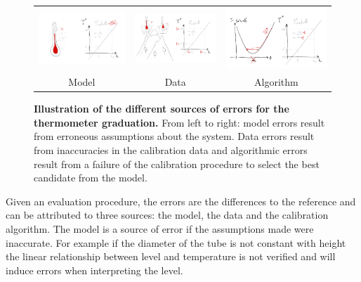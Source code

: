 \begin{bibunit}
\begin{figure}
\begin{tabular}{c|c|c}
     \hspace{-.15\linewidth}\includegraphics[width=.4\linewidth]{Introduction/pics/model_err_w_source.png}  &
     \includegraphics[width=.4\linewidth]{Introduction/pics/data_err_w_source.png} &
     \includegraphics[width=.4\linewidth]{Introduction/pics/optim_err_w_source.png} \\
     \hspace{-.15\linewidth}Model &  Data &  Algorithm \\
\end{tabular}
    \centering
    \caption{\textbf{Illustration of the different sources of errors for the thermometer graduation.} From left to right: model errors result from erroneous assumptions about the system. Data errors result from inaccuracies in the calibration data and algorithmic errors result from a failure of the calibration procedure to select the best candidate from the model.}
    \label{fig:err_sources}
\end{figure}
Given an evaluation procedure, the errors are the differences to the reference and can be attributed to three sources: the model, the data and the calibration algorithm.
 The model is a source of error if the assumptions made were inaccurate. For example if the diameter of the tube is not constant with height the linear relationship between level and temperature is not verified and will induce errors when interpreting the level.


\end{bibunit}
